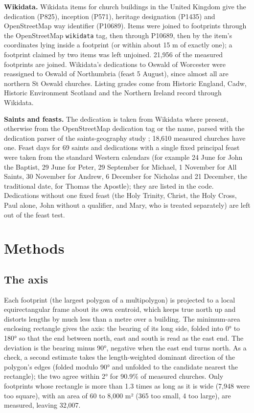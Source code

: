 \documentclass[11pt,a4paper]{article}
\begin{document}
\textbf{Wikidata.} Wikidata \citep{wikidata} items for church buildings in the United Kingdom give the dedication (P825), inception (P571), heritage designation (P1435) and OpenStreetMap way identifier (P10689). Items were joined to footprints through the OpenStreetMap \texttt{wikidata} tag, then through P10689, then by the item's coordinates lying inside a footprint (or within about 15 m of exactly one); a footprint claimed by two items was left unjoined. 21,956 of the measured footprints are joined. Wikidata's dedications to Oswald of Worcester were reassigned to Oswald of Northumbria (feast 5 August), since almost all are northern St Oswald churches. Listing grades come from Historic England, Cadw, Historic Environment Scotland and the Northern Ireland record through Wikidata.

\textbf{Saints and feasts.} The dedication is taken from Wikidata where present, otherwise from the OpenStreetMap dedication tag or the name, parsed with the dedication parser of the saints-geography study \citep{saintsgeo}; 18,610 measured churches have one. Feast days for 69 saints and dedications with a single fixed principal feast were taken from the standard Western calendars (for example 24 June for John the Baptist, 29 June for Peter, 29 September for Michael, 1 November for All Saints, 30 November for Andrew, 6 December for Nicholas and 21 December, the traditional date, for Thomas the Apostle); they are listed in the code. Dedications without one fixed feast (the Holy Trinity, Christ, the Holy Cross, Paul alone, John without a qualifier, and Mary, who is treated separately) are left out of the feast test.

\section{Methods}
\subsection{The axis}
Each footprint (the largest polygon of a multipolygon) is projected to a local equirectangular frame about its own centroid, which keeps true north up and distorts lengths by much less than a metre over a building. The minimum-area enclosing rectangle \citep{freeman} gives the axis: the bearing of its long side, folded into 0° to 180° so that the end between north, east and south is read as the east end. The deviation is the bearing minus 90°, negative when the east end turns north. As a check, a second estimate takes the length-weighted dominant direction of the polygon's edges (folded modulo 90° and unfolded to the candidate nearest the rectangle); the two agree within 2° for 90.9\% of measured churches. Only footprints whose rectangle is more than 1.3 times as long as it is wide (7,948 were too square), with an area of 60 to 8,000 m² (365 too small, 4 too large), are measured, leaving 32,007.
\end{document}
